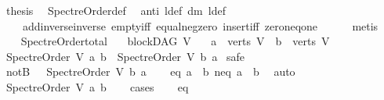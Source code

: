 \begin{isabellebody}
\ {\isachardoublequoteopen}{\isacharquery}{\kern0pt}thesis{\isachardoublequoteclose}\ \isamarkupfalse%
\ Spectre{\isacharunderscore}{\kern0pt}Order{\isacharunderscore}{\kern0pt}def\ \isamarkupfalse%
\ anti\ l{\isacharunderscore}{\kern0pt}def\ dm\ l{}{\isacharunderscore}{\kern0pt}def\ \isanewline
\ \ \ \ add{\isachardot}{\kern0pt}inverse{\isacharunderscore}{\kern0pt}inverse\ empty{\isacharunderscore}{\kern0pt}iff\ equal{\isacharunderscore}{\kern0pt}neg{\isacharunderscore}{\kern0pt}zero\ insert{\isacharunderscore}{\kern0pt}iff\ zero{\isacharunderscore}{\kern0pt}neq{\isacharunderscore}{\kern0pt}one\isanewline
\ \ \ \ \isamarkupfalse%
\ {\isacharparenleft}{\kern0pt}metis{\isacharparenright}{\kern0pt}\isanewline
{}\isamarkupfalse%
%
\endisatagproof
{\isafoldproof}%
%
\isadelimproof
\ \ \isanewline
%
\endisadelimproof
\ \ \isanewline
{}\isamarkupfalse%
\ Spectre{\isacharunderscore}{\kern0pt}Order{\isacharunderscore}{\kern0pt}total{\isacharcolon}{\kern0pt}\isanewline
\ \ \ {\isachardoublequoteopen}blockDAG\ V{\isachardoublequoteclose}\isanewline
\ \ \ {\isachardoublequoteopen}a\ {\isasymin}\ verts\ V\ {\isasymand}\ b\ {\isasymin}\ verts\ V{\isachardoublequoteclose}\ \isanewline
{}\ {\isachardoublequoteopen}Spectre{\isacharunderscore}{\kern0pt}Order\ V\ a\ b\ {\isasymor}\ Spectre{\isacharunderscore}{\kern0pt}Order\ V\ b\ a{\isachardoublequoteclose}\isanewline
%
\isadelimproof
%
\endisadelimproof
%
\isatagproof
{}\isamarkupfalse%
\ safe\isanewline
\ \ \isamarkupfalse%
\ notB{\isacharcolon}{\kern0pt}\ {\isachardoublequoteopen}\ {\isasymnot}\ Spectre{\isacharunderscore}{\kern0pt}Order\ V\ b\ a{\isachardoublequoteclose}\isanewline
\ \ \isamarkupfalse%
\ {\isacharparenleft}{\kern0pt}eq{\isacharparenright}{\kern0pt}\ {\isachardoublequoteopen}a\ {\isacharequal}{\kern0pt}\ b{\isachardoublequoteclose}{\isacharbar}{\kern0pt}\ {\isacharparenleft}{\kern0pt}neq{\isacharparenright}{\kern0pt}\ {\isachardoublequoteopen}a\ {\isasymnoteq}\ b{\isachardoublequoteclose}\ \isamarkupfalse%
\ auto\isanewline
\ \ \isamarkupfalse%
\ \isamarkupfalse%
\ {\isachardoublequoteopen}Spectre{\isacharunderscore}{\kern0pt}Order\ V\ a\ b{\isachardoublequoteclose}\isanewline
\ \ \isamarkupfalse%
\ {\isacharparenleft}{\kern0pt}cases{\isacharparenright}{\kern0pt}\isanewline
\ \ \isamarkupfalse%
\ eq\isanewline
\ \ \isamarkupfalse%

\end{isabellebody}
